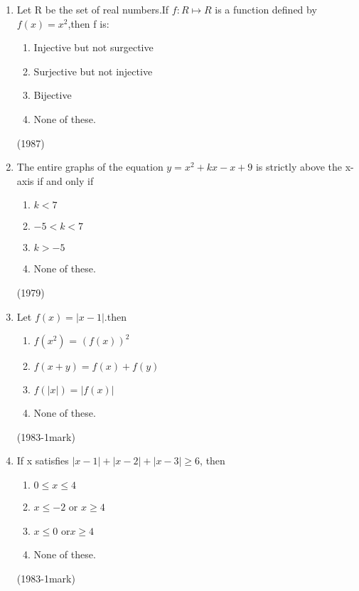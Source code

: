\documentclass[journal,12pt,twocolumn]{IEEEtran}
\theoremstyle{remark}
\begin{document}
\begin{enumerate}
     


\item Let R be the set of real numbers.If $f:R \mapsto R $ is
a function defined by$f(x)= x^2 $,then f is:

\begin{enumerate}
    
\item Injective but not surgective 
 
\item Surjective but not injective
 
\item Bijective
 
\item None of these.
\end{enumerate}


\hfill
{(1987)}


 


\item The entire graphs of the equation $y= x{^2}+ kx - x +9$ is strictly above the x-axis 
if and only if
\begin{enumerate}
    


 \item $k<7$
 
 \item $-5<k<7$
 
 \item $k>-5$
 
 \item None of these.
 \end{enumerate}
 \hfill
 {(1979)}


\item Let $f(x)=|x-1|.$then

\begin{enumerate}
  \item $f(x^2)$ = $(f(x))^2$

  \item  $f(x+y)=f(x)+f(y)$

  \item $f(|x|)=|f(x)|$

  \item None of these.
  \end{enumerate}
  
\hfill
{(1983-1mark)}




  \item If x satisfies $|x-1| + |x-2| + |x-3|\geq6$, then

\begin{enumerate}
    

  \item $0\leq x\leq4$
  
  \item $x \leq-2$ or $x\geq4$
  
  \item $x\leq0$ or$x\geq4$
  
  \item None of these.

  \end{enumerate}
  \hfill
  {(1983-1mark)}



  

\end{enumerate}
\end{document}
